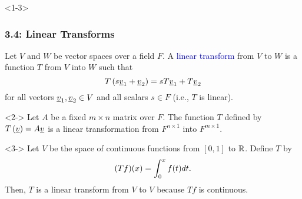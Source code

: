 \documentclass[10pt,english,aspectratio=169]{beamer}
\begin{document}
\begin{frame}<1-3> \frametitle{3.4: Linear Transforms}

\vspace{-1mm}

\begin{definition}
Let $V$ and $W$ be vector spaces over a field $F$.
A \textcolor{blue}{linear transform} from $V$ to $W$ is a function $T$ from $V$ into $W$ such that \vspace{-2mm}
\begin{equation*}
T \left( s \vecnot{v}_1 + \vecnot{v}_2 \right)
= s T \vecnot{v}_1 + T \vecnot{v}_2  \vspace{-2mm}
\end{equation*}
for all vectors $\underline{v}_1, \underline{v}_2 \in V$ and all scalars $s \in F$ (i.e., $T$ is linear).
\end{definition}

\vspace{-1mm}

\begin{example}<2->
Let $A$ be a fixed $m \times n$ matrix over $F$.
The function $T$ defined by $T \left( \underline{v} \right) = A \underline{v}$ is a linear transformation from $F^{n \times 1}$ into $F^{m \times 1}$.
\end{example}

\vspace{-1mm}

\begin{example}<3->
Let $V$ be the space of continuous functions from $[0,1]$ to $\mathbb{R}$. Define $T$ by  \vspace{-2mm}
\begin{equation*}
(Tf)(x) = \int_{0}^x f(t) dt .  \vspace{-2mm}
\end{equation*}
Then, $T$ is a linear transform from $V$ to $V$ because $Tf$ is continuous.
\end{example}


\end{frame}
\end{document}
